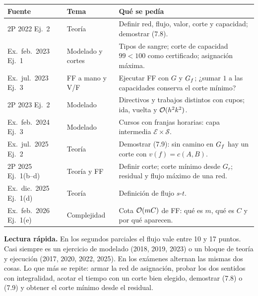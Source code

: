 \begin{center}
\small
\begin{tabularx}{\textwidth}{@{}>{\raggedright\arraybackslash}p{2.75cm}>{\raggedright\arraybackslash}p{2.5cm}>{\raggedright\arraybackslash}X@{}}
\toprule
Fuente & Tema & Qué se pedía \\
\midrule
2P 2022 Ej.~2 & Teoría & Definir red, flujo, valor, corte y capacidad; demostrar (7.8). \\
Ex.\ feb.~2023 Ej.~1 & Modelado y cortes & Tipos de sangre; corte de capacidad $99<100$ como certificado; asignación máxima. \\
Ex.\ jul.~2023 Ej.~3 & FF a mano y V/F & Ejecutar FF con $G$ y $G_f$; ¿sumar $1$ a las capacidades conserva el corte mínimo? \\
2P 2023 Ej.~2 & Modelado & Directivos y trabajos distintos con cupos; ida, vuelta y $\mathcal{O}(h^2k^2)$. \\
Ex.\ feb.~2024 Ej.~3 & Modelado & Cursos con franjas horarias: capa intermedia $\mathcal E\times\mathcal S$. \\
Ex.\ jul.~2025 Ej.~2 & Teoría & Demostrar (7.9): sin camino en $G_f$ hay un corte con $v(f)=c(A,B)$. \\
2P 2025 Ej.~1(b--d) & Teoría y FF & Definir corte; corte mínimo desde $G_r$; residual y flujo máximo de una red. \\
Ex.\ dic.~2025 Ej.~1(d) & Teoría & Definición de flujo $s$-$t$. \\
Ex.\ feb.~2026 Ej.~1(e) & Complejidad & Cota $\mathcal{O}(mC)$ de FF: qué es $m$, qué es $C$ y por qué aparecen. \\
\bottomrule
\end{tabularx}
\end{center}

\textbf{Lectura rápida.} En los segundos parciales el flujo vale entre 10 y 17 puntos. Casi siempre es un ejercicio de modelado (2018, 2019, 2023) o un bloque de teoría y ejecución (2017, 2020, 2022, 2025). En los exámenes alternan las mismas dos cosas. Lo que más se repite: armar la red de asignación, probar los dos sentidos con integralidad, acotar el tiempo con un corte bien elegido, demostrar (7.8) o (7.9) y obtener el corte mínimo desde el residual.
